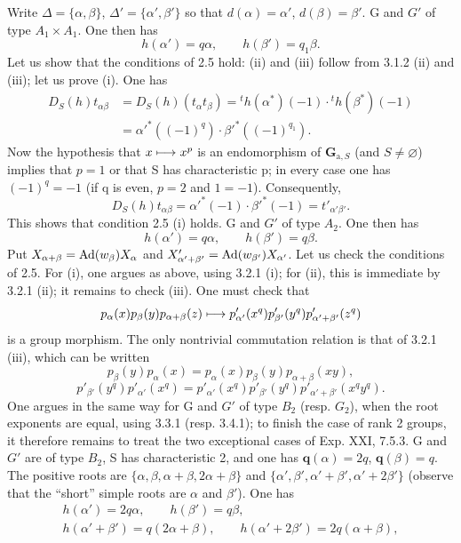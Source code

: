 Write $\Delta=\{\alpha,\beta\}$, $\Delta'=\{\alpha',\beta'\}$ so that $d(\alpha)=\alpha'$, $d(\beta)=\beta'$.
G and $G'$ of type $A_1\times A_1$. One then has
\[
h(\alpha')=q\alpha,\qquad h(\beta')=q_1\beta.
\]
Let us show that the conditions of 2.5 hold: (ii) and (iii) follow from 3.1.2 (ii) and (iii); let us prove (i). One has
\[
\begin{aligned}
D_S(h)t_{\alpha\beta}&=D_S(h)(t_\alpha t_\beta)={}^th(\alpha^*)(-1)\cdot{}^th(\beta^*)(-1)\\
&=\alpha'^*((-1)^q)\cdot\beta'^*((-1)^{q_1}).
\end{aligned}
\]
Now the hypothesis that $x\longmapsto x^p$ is an endomorphism of $\mathbf G_{\mathrm a,S}$ (and $S\ne\varnothing$) implies that $p=1$ or that S has characteristic p; in every case one has $(-1)^q=-1$ (if q is even, $p=2$ and $1=-1$). Consequently,
\[
D_S(h)t_{\alpha\beta}=\alpha'^*(-1)\cdot\beta'^*(-1)=t'_{\alpha'\beta'}.
\]
This shows that condition 2.5 (i) holds.
G and $G'$ of type $A_2$. One then has
\[
h(\alpha')=q\alpha,\qquad h(\beta')=q\beta.
\]
Put $X_{\alpha+\beta}=\operatorname{Ad}(w_\beta)X_\alpha$ and $X'_{\alpha'+\beta'}=\operatorname{Ad}(w_{\beta'})X_{\alpha'}$. Let us check the conditions of 2.5.
For (i), one argues as above, using 3.2.1 (i); for (ii), this is immediate by 3.2.1 (ii); it remains to check (iii). One must check that
\[
p_\alpha(x)p_\beta(y)p_{\alpha+\beta}(z)\longmapsto p'_{\alpha'}(x^q)p'_{\beta'}(y^q)p'_{\alpha'+\beta'}(z^q)
\]
is a group morphism. The only nontrivial commutation relation is that of 3.2.1 (iii), which can be written
\[
p_\beta(y)p_\alpha(x)=p_\alpha(x)p_\beta(y)p_{\alpha+\beta}(xy),
\]
\[
p'_{\beta'}(y^q)p'_{\alpha'}(x^q)=p'_{\alpha'}(x^q)p'_{\beta'}(y^q)p'_{\alpha'+\beta'}(x^qy^q).
\]
One argues in the same way for G and $G'$ of type $B_2$ (resp. $G_2$), when the root exponents are equal, using 3.3.1 (resp. 3.4.1); to finish the case of rank 2 groups, it therefore remains to treat the two exceptional cases of Exp. XXI, 7.5.3.
G and $G'$ are of type $B_2$, S has characteristic 2, and one has $\mathbf q(\alpha)=2q$, $\mathbf q(\beta)=q$. The positive roots are $\{\alpha,\beta,\alpha+\beta,2\alpha+\beta\}$ and $\{\alpha',\beta',\alpha'+\beta',\alpha'+2\beta'\}$ (observe that the ``short'' simple roots are $\alpha$ and $\beta'$). One has
\[
\begin{gathered}
h(\alpha')=2q\alpha,\qquad h(\beta')=q\beta,\\
h(\alpha'+\beta')=q(2\alpha+\beta),\qquad h(\alpha'+2\beta')=2q(\alpha+\beta),
\end{gathered}
\]
